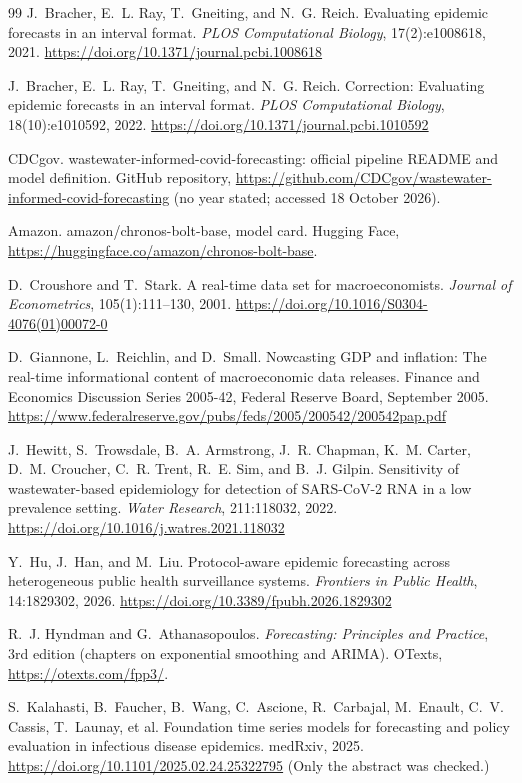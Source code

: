 \documentclass[11pt]{article}
\begin{document}
\begin{thebibliography}{99}
 J.~Bracher, E.~L. Ray, T.~Gneiting, and N.~G. Reich. Evaluating epidemic forecasts in an interval format. \emph{PLOS Computational Biology}, 17(2):e1008618, 2021. \url{https://doi.org/10.1371/journal.pcbi.1008618}

 J.~Bracher, E.~L. Ray, T.~Gneiting, and N.~G. Reich. Correction: Evaluating epidemic forecasts in an interval format. \emph{PLOS Computational Biology}, 18(10):e1010592, 2022. \url{https://doi.org/10.1371/journal.pcbi.1010592}

 CDCgov. wastewater-informed-covid-forecasting: official pipeline README and model definition. GitHub repository, \url{https://github.com/CDCgov/wastewater-informed-covid-forecasting} (no year stated; accessed 18 October 2026).

 Amazon. amazon/chronos-bolt-base, model card. Hugging Face, \url{https://huggingface.co/amazon/chronos-bolt-base}.

 D.~Croushore and T.~Stark. A real-time data set for macroeconomists. \emph{Journal of Econometrics}, 105(1):111--130, 2001. \url{https://doi.org/10.1016/S0304-4076(01)00072-0}

 D.~Giannone, L.~Reichlin, and D.~Small. Nowcasting GDP and inflation: The real-time informational content of macroeconomic data releases. Finance and Economics Discussion Series 2005-42, Federal Reserve Board, September 2005. \url{https://www.federalreserve.gov/pubs/feds/2005/200542/200542pap.pdf}

 J.~Hewitt, S.~Trowsdale, B.~A. Armstrong, J.~R. Chapman, K.~M. Carter, D.~M. Croucher, C.~R. Trent, R.~E. Sim, and B.~J. Gilpin. Sensitivity of wastewater-based epidemiology for detection of SARS-CoV-2 RNA in a low prevalence setting. \emph{Water Research}, 211:118032, 2022. \url{https://doi.org/10.1016/j.watres.2021.118032}

 Y.~Hu, J.~Han, and M.~Liu. Protocol-aware epidemic forecasting across heterogeneous public health surveillance systems. \emph{Frontiers in Public Health}, 14:1829302, 2026. \url{https://doi.org/10.3389/fpubh.2026.1829302}

 R.~J. Hyndman and G.~Athanasopoulos. \emph{Forecasting: Principles and Practice}, 3rd edition (chapters on exponential smoothing and ARIMA). OTexts, \url{https://otexts.com/fpp3/}.

 S.~Kalahasti, B.~Faucher, B.~Wang, C.~Ascione, R.~Carbajal, M.~Enault, C.~V. Cassis, T.~Launay, et al. Foundation time series models for forecasting and policy evaluation in infectious disease epidemics. medRxiv, 2025. \url{https://doi.org/10.1101/2025.02.24.25322795} (Only the abstract was checked.)


\end{thebibliography}
\end{document}
